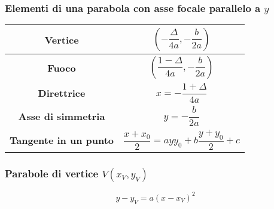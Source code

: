 \subsubsection{Elementi di una parabola con asse focale parallelo a $y$}
\begin{center}
	\begin{tabular}{c | c}
		\textbf{Vertice} & $\left(-\dfrac{\Delta}{4a},-\dfrac{b}{2a}\right)$\\\hline
		\textbf{Fuoco} & $\left(\dfrac{1-\Delta}{4a},-\dfrac{b}{2a}\right)$\\\hline
		\textbf{Direttrice} & $x=-\dfrac{1+\Delta}{4a}$\\\hline
		\textbf{Asse di simmetria} & $y=-\dfrac{b}{2a}$\\\hline
		\textbf{Tangente in un punto} & $\dfrac{x+x_0}{2}=ayy_0+b\dfrac{y+y	_0}{2}+c$
	\end{tabular}
\end{center}

\subsubsection{Parabole di vertice $V(x_V,y_V)$}
\begin{equation*}
  y-y_V=a(x-x_V)^2
\end{equation*}

